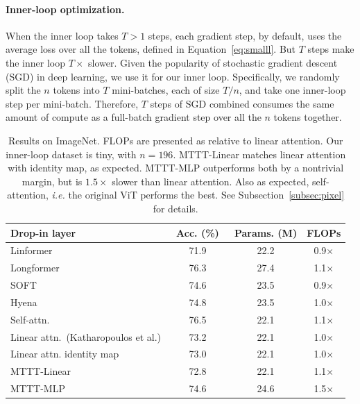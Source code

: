 \documentclass{article}
\begin{document}
\paragraph{Inner-loop optimization.}
When the inner loop takes $T>1$ steps, each gradient step, by default, uses the average loss over all the tokens, defined in Equation~\ref{eq:smalll}.
But $T$ steps make the inner loop $T\times$ slower.
Given the popularity of stochastic gradient descent (SGD) in deep learning, we use it for our inner loop.
Specifically, we randomly split the $n$ tokens into $T$ mini-batches, each of size $T/n$, and take one inner-loop step per mini-batch.
Therefore, $T$ steps of SGD combined consumes the same amount of compute as a full-batch gradient step over all the $n$ tokens together.

\begin{table}
\centering
\vspace{-1ex}
\begin{tabular}{|l|c|c|c|}
\toprule
Drop-in layer
& ~Acc. (\%)~
& {\footnotesize Params. (M)}
& {\small FLOPs}
\\
\midrule
Linformer~{\tiny \citep{wang2020linformer}}
& 71.9 & 22.2 & 0.9$\times$\\
Longformer~{\tiny \citep{beltagy2020longformer}}
& 76.3 & 27.4 & 1.1$\times$\\
SOFT~{\tiny \citep{lu2021soft}}
& 74.6 & 23.5 & 0.9$\times$\\
Hyena~{\tiny \citep{poli2023hyena}}
& 74.8 & 23.5 & 1.0$\times$\\
\midrule
Self-attn.~{\tiny \citep{beyer2022better}} 
& 76.5 & 22.1 & 1.1$\times$ \\
Linear attn.~{\tiny (Katharopoulos et al.)}
& 73.2 & 22.1 & 1.0$\times$ \\
Linear attn. identity map
& 73.0 & 22.1 & 1.0$\times$ \\
\midrule
MTTT-Linear 
& 72.8 & 22.1 & 1.1$\times$ \\
MTTT-MLP 
& 74.6 & 24.6 & 1.5$\times$ \\
\bottomrule
\end{tabular}
\caption{
Results on ImageNet.
FLOPs are presented as relative to linear attention.
Our inner-loop dataset is tiny, with $n=196$.
MTTT-Linear matches linear attention with identity map, as expected. 
MTTT-MLP outperforms both by a nontrivial margin, but is $1.5\times$ slower than linear attention.
Also as expected, self-attention, \textit{i.e.} the original ViT performs the best.
See Subsection~\ref{subsec:pixel} for details.
}
\vspace{-1ex}
\label{tab:patch}
\end{table}
\end{document}
